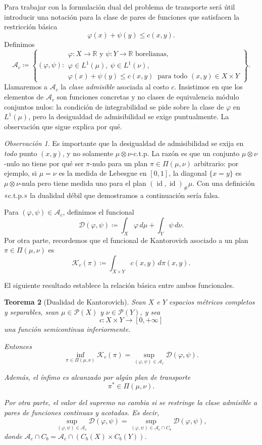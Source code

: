 \documentclass[12pt, a4paper]{amsbook}
\newcommand{\id}{\operatorname{id}}
\newcommand{\R}{{\mathbb R}}
\newcommand{\D}{{\mathcal D}}
\newtheorem{teo}{Teorema}[section]
\theoremstyle{remark}
\newtheorem{obs}[teo]{Observación}
\theoremstyle{definition}
\numberwithin{section}{chapter}
\numberwithin{subsection}{section}
\numberwithin{equation}{section}
\numberwithin{figure}{chapter}
\begin{document}
Para trabajar con la formulación dual del problema de transporte será útil
introducir una notación para la clase de pares de funciones que satisfacen
la restricción básica
\[
\varphi(x)+\psi(y)\leq c(x,y).
\]
Definimos
\[
\mathcal A_c
\coloneqq
\left\{
(\varphi,\psi):
\begin{array}{l}
\varphi\colon X\to\R\text{ y }\psi\colon Y\to\R\text{ borelianas},\\[2pt]
\varphi\in L^1(\mu),\ \psi\in L^1(\nu),\\[2pt]
\varphi(x)+\psi(y)\leq c(x,y)\ \text{ para todo }(x,y)\in X\times Y
\end{array}
\right\}.
\]
Llamaremos a $\mathcal A_c$ la \emph{clase admisible} asociada al costo $c$.
Insistimos en que los elementos de $\mathcal A_c$ son funciones concretas y no
clases de equivalencia módulo conjuntos nulos: la condición de integrabilidad
se pide sobre la clase de $\varphi$ en $L^1(\mu)$, pero la desigualdad de
admisibilidad se exige puntualmente. La observación que sigue explica por qué.

\begin{obs}
Es importante que la desigualdad de admisibilidad se exija en \emph{todo} punto
$(x,y)$, y no solamente $\mu\otimes\nu$-c.t.p. La razón es que un conjunto
$\mu\otimes\nu$-nulo no tiene por qué ser $\pi$-nulo para un plan
$\pi\in\Pi(\mu,\nu)$ arbitrario: por ejemplo, si $\mu=\nu$ es la medida de
Lebesgue en $[0,1]$, la diagonal $\{x=y\}$ es $\mu\otimes\nu$-nula pero tiene
medida uno para el plan $(\id,\id)_\#\mu$. Con una definición «c.t.p.» la
dualidad débil que demostramos a continuación sería falsa.
\end{obs}

Para $(\varphi,\psi)\in\mathcal A_c$, definimos el funcional
\[
\D(\varphi,\psi)
\coloneqq
\int_X\varphi\,d\mu
+
\int_Y\psi\,d\nu.
\]
Por otra parte, recordemos que el funcional de Kantorovich asociado a un
plan $\pi\in\Pi(\mu,\nu)$ es
\[
\mathcal K_c(\pi)
\coloneqq
\int_{X\times Y}c(x,y)\,d\pi(x,y).
\]

El siguiente resultado establece la relación básica entre ambos
funcionales.

\begin{teo}[Dualidad de Kantorovich]\label{teo.dualidad}
Sean $X$ e $Y$ espacios métricos completos y separables, sean $\mu\in \mathcal P(X)$ y $\nu\in \mathcal P(Y)$, y sea
\[
c:X\times Y\to[0,+\infty]
\]
una función semicontinua inferiormente.

Entonces
\[
\inf_{\pi\in\Pi(\mu,\nu)}
\mathcal K_c(\pi)
=
\sup_{(\varphi,\psi)\in\mathcal A_c}
\D(\varphi,\psi).
\]

Además, el ínfimo es alcanzado por algún plan de transporte
\[
\pi^*\in\Pi(\mu,\nu).
\]

Por otra parte, el valor del supremo no cambia si se restringe la clase admisible a pares de funciones continuas y acotadas. Es decir,
\[
\sup_{(\varphi,\psi)\in\mathcal A_c} \D(\varphi,\psi)
=
\sup_{(\varphi,\psi)\in
\mathcal A_c\cap C_b}
\D(\varphi,\psi),
\]
donde $\mathcal A_c\cap C_b = \mathcal A_c\cap(C_b(X)\times C_b(Y))$.
\end{teo}
\end{document}
